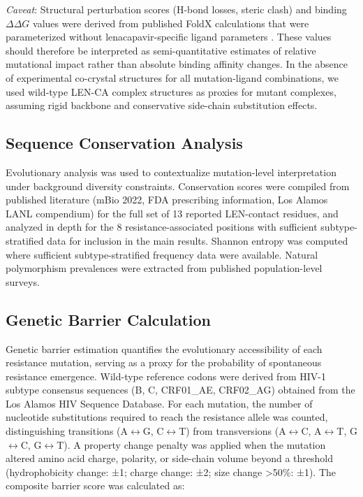 \documentclass[12pt,a4paper]{article}
\begin{document}
\textit{Caveat}: Structural perturbation scores (H-bond losses, steric clash) and binding $\Delta\Delta G$ values were derived from published FoldX calculations that were parameterized without lenacapavir-specific ligand parameters \cite{Bester2022}. These values should therefore be interpreted as semi-quantitative estimates of relative mutational impact rather than absolute binding affinity changes. In the absence of experimental co-crystal structures for all mutation-ligand combinations, we used wild-type LEN-CA complex structures as proxies for mutant complexes, assuming rigid backbone and conservative side-chain substitution effects.

\subsection{Sequence Conservation Analysis}

Evolutionary analysis was used to contextualize mutation-level interpretation under background diversity constraints. Conservation scores were compiled from published literature (mBio 2022, FDA prescribing information, Los Alamos LANL compendium) \cite{Bester2022} for the full set of 13 reported LEN-contact residues, and analyzed in depth for the 8 resistance-associated positions with sufficient subtype-stratified data for inclusion in the main results. Shannon entropy was computed where sufficient subtype-stratified frequency data were available. Natural polymorphism prevalences were extracted from published population-level surveys.

\subsection{Genetic Barrier Calculation}

Genetic barrier estimation quantifies the evolutionary accessibility of each resistance mutation, serving as a proxy for the probability of spontaneous resistance emergence. Wild-type reference codons were derived from HIV-1 subtype consensus sequences (B, C, CRF01\_AE, CRF02\_AG) obtained from the Los Alamos HIV Sequence Database. For each mutation, the number of nucleotide substitutions required to reach the resistance allele was counted, distinguishing transitions (A$\leftrightarrow$G, C$\leftrightarrow$T) from transversions (A$\leftrightarrow$C, A$\leftrightarrow$T, G$\leftrightarrow$C, G$\leftrightarrow$T). A property change penalty was applied when the mutation altered amino acid charge, polarity, or side-chain volume beyond a threshold (hydrophobicity change: ±1; charge change: ±2; size change >50\%: ±1). The composite barrier score was calculated as:
\end{document}
